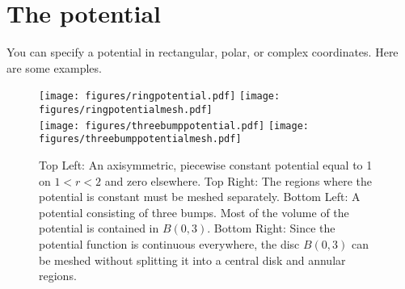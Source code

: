 \section{The potential}
\label{sec-potential}

You can specify a potential in rectangular, polar, or complex
coordinates. Here are some examples.

\begin{figure}[h!]
 \texttt{[image: figures/ringpotential.pdf]}
 \texttt{[image: figures/ringpotentialmesh.pdf]} \\ 
 \texttt{[image: figures/threebumppotential.pdf]}
 \texttt{[image: figures/threebumppotentialmesh.pdf]}
 \caption{Top Left: An axisymmetric, piecewise constant potential
                equal to 1 on $1 < r < 2$ and zero elsewhere.
          Top Right: The regions where the potential is constant
                 must be meshed separately.
          Bottom Left: A potential consisting of three bumps. Most
                 of the volume of the potential is contained in
                 $B(0,3)$.
          Bottom Right: Since the potential function is continuous
                 everywhere, the disc $B(0,3)$ can be meshed without
                 splitting it into a central disk and annular regions.}
\end{figure}
